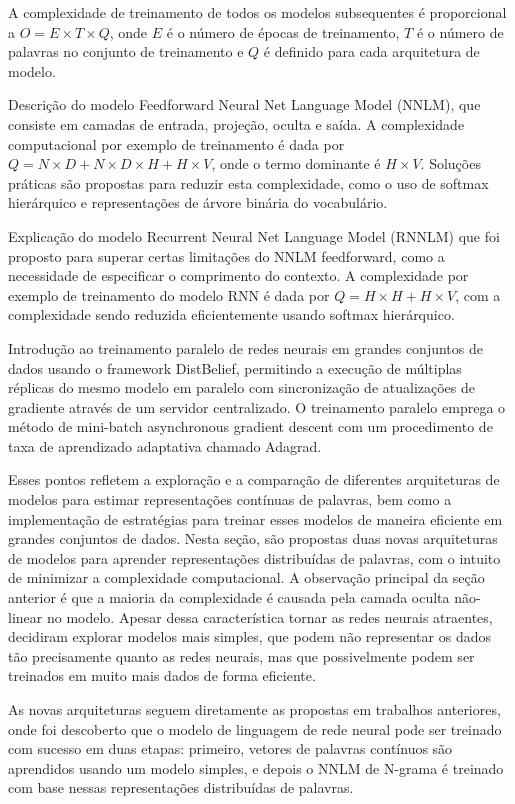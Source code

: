 A complexidade de treinamento de todos os modelos subsequentes é proporcional a \(O = E \times T \times Q\), onde \(E\) é o número de épocas de treinamento, \(T\) é o número de palavras no conjunto de treinamento e \(Q\) é definido para cada arquitetura de modelo.

Descrição do modelo Feedforward Neural Net Language Model (NNLM), que consiste em camadas de entrada, projeção, oculta e saída. A complexidade computacional por exemplo de treinamento é dada por \(Q = N \times D + N \times D \times H + H \times V\), onde o termo dominante é \(H \times V\). Soluções práticas são propostas para reduzir esta complexidade, como o uso de softmax hierárquico e representações de árvore binária do vocabulário.

Explicação do modelo Recurrent Neural Net Language Model (RNNLM) que foi proposto para superar certas limitações do NNLM feedforward, como a necessidade de especificar o comprimento do contexto. A complexidade por exemplo de treinamento do modelo RNN é dada por \(Q = H \times H + H \times V\), com a complexidade sendo reduzida eficientemente usando softmax hierárquico.

Introdução ao treinamento paralelo de redes neurais em grandes conjuntos de dados usando o framework DistBelief, permitindo a execução de múltiplas réplicas do mesmo modelo em paralelo com sincronização de atualizações de gradiente através de um servidor centralizado. O treinamento paralelo emprega o método de mini-batch asynchronous gradient descent com um procedimento de taxa de aprendizado adaptativa chamado Adagrad.

Esses pontos refletem a exploração e a comparação de diferentes arquiteturas de modelos para estimar representações contínuas de palavras, bem como a implementação de estratégias para treinar esses modelos de maneira eficiente em grandes conjuntos de dados.
Nesta seção, são propostas duas novas arquiteturas de modelos para aprender representações distribuídas de palavras, com o intuito de minimizar a complexidade computacional. A observação principal da seção anterior é que a maioria da complexidade é causada pela camada oculta não-linear no modelo. Apesar dessa característica tornar as redes neurais atraentes, decidiram explorar modelos mais simples, que podem não representar os dados tão precisamente quanto as redes neurais, mas que possivelmente podem ser treinados em muito mais dados de forma eficiente.

As novas arquiteturas seguem diretamente as propostas em trabalhos anteriores, onde foi descoberto que o modelo de linguagem de rede neural pode ser treinado com sucesso em duas etapas: primeiro, vetores de palavras contínuos são aprendidos usando um modelo simples, e depois o NNLM de N-grama é treinado com base nessas representações distribuídas de palavras.

